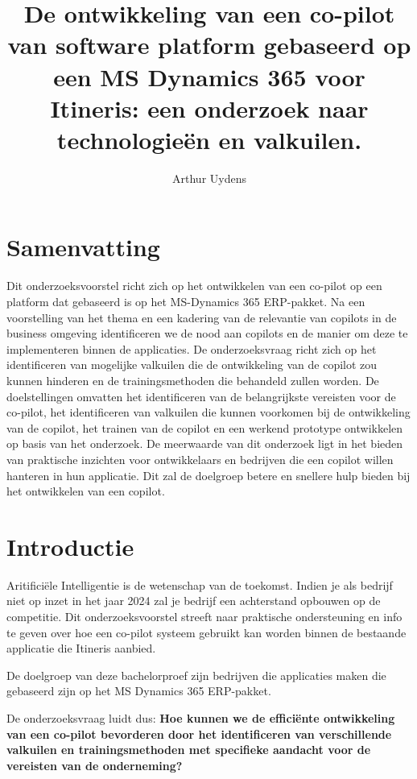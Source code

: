 \documentclass{hogent-article}
\title{De ontwikkeling van een co-pilot van software platform gebaseerd op een MS Dynamics 365 voor Itineris: een onderzoek naar technologieën en valkuilen.}
\author{Arthur Uydens}
\begin{document}
    
    \section{Samenvatting}
    Dit onderzoeksvoorstel richt zich op het ontwikkelen van een co-pilot op een platform dat gebaseerd is op het MS-Dynamics 365 ERP-pakket. Na een voorstelling van het thema en een kadering van de relevantie van copilots in de business omgeving identificeren we de nood aan copilots en de manier om deze te implementeren binnen de applicaties.
    De onderzoeksvraag richt zich op het identificeren van mogelijke valkuilen die de ontwikkeling van de copilot zou kunnen hinderen en de trainingsmethoden die behandeld zullen worden. De doelstellingen omvatten het identificeren van de belangrijkste vereisten voor de co-pilot, het identificeren van valkuilen die kunnen voorkomen bij de ontwikkeling van de copilot, het trainen van de copilot en een werkend prototype ontwikkelen op basis van het onderzoek. De meerwaarde van dit onderzoek ligt in het bieden van praktische inzichten voor ontwikkelaars en bedrijven die een copilot willen hanteren in hun applicatie. Dit zal de doelgroep betere en snellere hulp bieden bij het ontwikkelen van een copilot. 
    
    \section{Introductie}
    Aritificiële Intelligentie is de wetenschap van de toekomst. Indien je als bedrijf niet op inzet in het jaar 2024 zal je bedrijf een achterstand opbouwen op de competitie. Dit onderzoeksvoorstel streeft naar praktische ondersteuning en info te geven over hoe een co-pilot systeem gebruikt kan worden binnen de bestaande applicatie die Itineris aanbied.  
    
    De doelgroep van deze bachelorproef zijn bedrijven die applicaties maken die gebaseerd zijn op het MS Dynamics 365 ERP-pakket. 
    
    De onderzoeksvraag luidt dus: \textbf{
        Hoe kunnen we de efficiënte ontwikkeling van een co-pilot bevorderen door het identificeren van verschillende valkuilen en trainingsmethoden met specifieke aandacht voor de vereisten van de onderneming? 
    }
    
\end{document}
